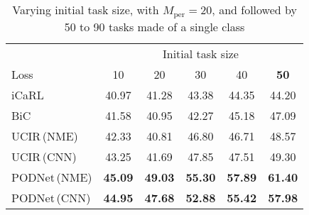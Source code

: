 \begin{table*}
    \centering
    \begin{tabular}{@{}l|ccccc@{}}
        \toprule
                                                     & \multicolumn{5}{c}{Initial task size}                                                                     \\
        \cmidrule{2-6}
        Loss                                         & 10                                    & 20             & 30             & 40             & \textbf{50}    \\
        \midrule
        iCaRL \cite{rebuffi2017icarl}                & 40.97                                 & 41.28          & 43.38          & 44.35          & 44.20          \\
        BiC \cite{wu2019bias_correction}             & 41.58                                 & 40.95          & 42.27          & 45.18          & 47.09          \\
        UCIR\,{\scriptsize (NME)} \cite{hou2019ucir} & 42.33                                 & 40.81          & 46.80          & 46.71          & 48.57          \\
        UCIR\,{\scriptsize (CNN)}                    & 43.25                                 & 41.69          & 47.85          & 47.51          & 49.30          \\
        PODNet\,{\scriptsize (NME)}                  & \textbf{45.09}                        & \textbf{49.03} & \textbf{55.30} & \textbf{57.89} & \textbf{61.40} \\
        PODNet\,{\scriptsize (CNN)}                  & \textbf{44.95}                        & \textbf{47.68} & \textbf{52.88} & \textbf{55.42} & \textbf{57.98} \\
        \bottomrule
    \end{tabular}
    \caption{Varying initial task size, with $M_\mathrm{per} = 20$, and followed by 50 to 90 tasks made of a single class}
    \label{tab:podnet_sub_initialincrement}
\end{table*}

